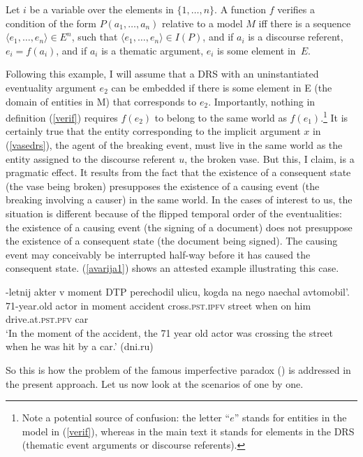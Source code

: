 \documentclass[output=paper,colorlinks,citecolor=brown]{langscibook}
\begin{document}
\eanoraggedright\label{verif}
Let $i$ be a variable over the elements in $\{1,\dots,n\}$. A function $f$ verifies a condition of the form $P(a_1,\dots,a_n)$ relative to a model $M$ iff there is a sequence $\langle e_1,\dots,e_n \rangle \in E^n$, such that $\langle e_1,\dots,e_n \rangle \in I(P)$, and if $a_i$ is a discourse referent, $e_i = f(a_i)$, and if $a_i$ is a thematic argument, $e_i$ is some element in~$E$.
\z

\noindent Following this example, I will assume that a DRS with an uninstantiated eventuality argument $e_2$ can be embedded if there is some element in E (the domain of entities in M) that corresponds to $e_2$. Importantly, nothing in definition (\ref{verif}) requires 
$f(e_2)$ to belong to the same world as $f(e_1)$.\footnote{Note a potential source of confusion: the letter ``$e$'' stands for entities in the model in (\ref{verif}), whereas in the main text it stands for elements in the DRS (thematic event arguments or discourse referents).} It is certainly true that the entity corresponding to the implicit argument $x$ in (\ref{vasedrs}), the agent of the breaking event, must live in the same world as the entity assigned to the discourse referent $u$, the broken vase. But this, I claim, is a pragmatic effect. It results from the fact that the existence of a consequent state (the vase being broken) presupposes the existence of a causing event (the breaking involving a causer) in the same world. In the cases of interest to us, the situation is different because of the flipped temporal order of the eventualities: the existence of a causing event (the signing of a document) does not presuppose the existence of a consequent state (the document being signed). The causing event may conceivably be interrupted half-way before it has caused the consequent state. (\ref{avarija1}) shows an attested example illustrating this case.          

\ea\label{avarija1}
-letnij akter v moment 
DTP perechodil ulicu, kogda na 
nego naechal avtomobil'.\\
71-year.old actor in moment accident cross.\textsc{pst.ipfv} street 
when on him drive.at.\textsc{pst.pfv} car \\
\glt `In the moment of the accident, the 71 year old actor was crossing the street  
when he was hit by a car.' \hfill (dni.ru)
\z 

\noindent So this is how the problem of the famous imperfective paradox (\citealt{Dowty1980,Landman92}) is addressed in the present approach.
Let us now look at the scenarios of  one by one.
\end{document}
